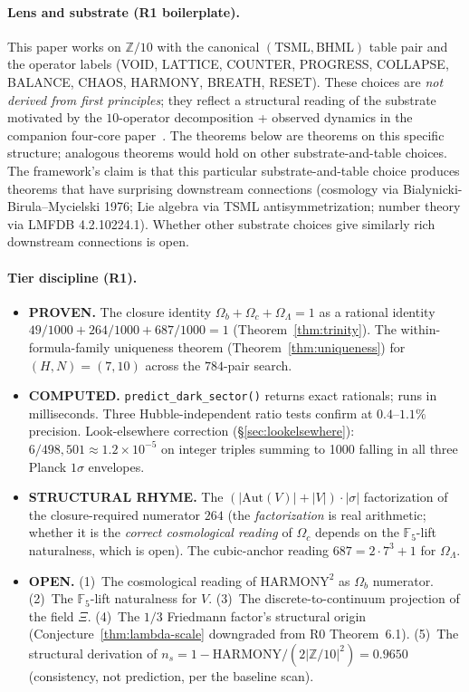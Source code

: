 \documentclass[11pt,reqno]{amsart}
\theoremstyle{plain}
\theoremstyle{definition}
\theoremstyle{remark}
\newcommand{\Z}{\mathbb{Z}}
\newcommand{\F}{\mathbb{F}}
\newcommand{\Aut}{\mathrm{Aut}}
\begin{document}
\paragraph{Lens and substrate (R1 boilerplate).}
This paper works on $\Z/10$ with the canonical $(\mathrm{TSML},
\mathrm{BHML})$ table pair and the operator labels (VOID, LATTICE,
COUNTER, PROGRESS, COLLAPSE, BALANCE, CHAOS, HARMONY, BREATH,
RESET). These choices are \emph{not derived from first principles};
they reflect a structural reading of the substrate motivated by
the $10$-operator decomposition + observed dynamics in the
companion four-core paper~\cite{SandersGish2026FourCore}. The
theorems below are theorems on this specific structure; analogous
theorems would hold on other substrate-and-table choices.
The framework's claim is that this particular substrate-and-table
choice produces theorems that have surprising downstream connections
(cosmology via Bialynicki-Birula--Mycielski 1976; Lie algebra via
TSML antisymmetrization; number theory via LMFDB 4.2.10224.1).
Whether other substrate choices give similarly rich downstream
connections is open.

\paragraph{Tier discipline (R1).}
\begin{itemize}
\item \textbf{PROVEN.} The closure identity
$\Omega_b + \Omega_c + \Omega_\Lambda = 1$ as a rational identity
$49/1000 + 264/1000 + 687/1000 = 1$ (Theorem~\ref{thm:trinity}).
The within-formula-family uniqueness theorem
(Theorem~\ref{thm:uniqueness}) for $(H, N) = (7, 10)$ across
the $784$-pair search.
\item \textbf{COMPUTED.} \texttt{predict\_dark\_sector()} returns
exact rationals; runs in milliseconds. Three Hubble-independent
ratio tests confirm at $0.4$--$1.1\%$ precision. Look-elsewhere
correction (\S\ref{sec:lookelsewhere}): $6 / 498{,}501 \approx
1.2 \times 10^{-5}$ on integer triples summing to 1000 falling
in all three Planck $1\sigma$ envelopes.
\item \textbf{STRUCTURAL RHYME.} The $(|\Aut(V)| + |V|) \cdot |\sigma|$
factorization of the closure-required numerator $264$ (the
\emph{factorization} is real arithmetic; whether it is the
\emph{correct cosmological reading} of $\Omega_c$ depends on the
$\F_5$-lift naturalness, which is open). The cubic-anchor
reading $687 = 2 \cdot 7^3 + 1$ for $\Omega_\Lambda$.
\item \textbf{OPEN.} (1)~The cosmological reading of
$\mathrm{HARMONY}^2$ as $\Omega_b$ numerator. (2)~The $\F_5$-lift
naturalness for $V$. (3)~The discrete-to-continuum projection of
the field $\Xi$. (4)~The $1/3$ Friedmann factor's structural
origin (Conjecture~\ref{thm:lambda-scale} downgraded from R0
Theorem~6.1). (5)~The structural derivation of
$n_s = 1 - \mathrm{HARMONY}/(2|\Z/10|^2) = 0.9650$
(consistency, not prediction, per the baseline scan).
\end{itemize}
\end{document}
